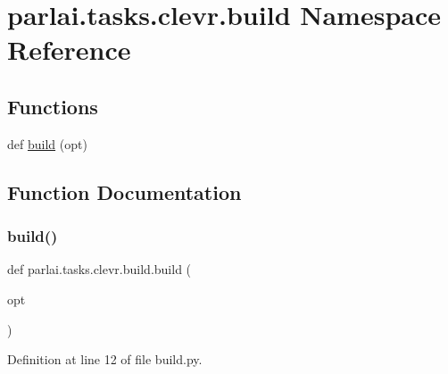 \hypertarget{namespaceparlai_1_1tasks_1_1clevr_1_1build}{}\section{parlai.\+tasks.\+clevr.\+build Namespace Reference}
\label{namespaceparlai_1_1tasks_1_1clevr_1_1build}
\subsection*{Functions}
\begin{DoxyCompactItemize}
\item 
def \hyperlink{namespaceparlai_1_1tasks_1_1clevr_1_1build_a129ccb17872c5d5b1538020e5642ab91}{build} (opt)
\end{DoxyCompactItemize}


\subsection{Function Documentation}
\mbox{\label{namespaceparlai_1_1tasks_1_1clevr_1_1build_a129ccb17872c5d5b1538020e5642ab91}} 
\subsubsection{\texorpdfstring{build()}{build()}}
{\footnotesize\ttfamily def parlai.\+tasks.\+clevr.\+build.\+build (\begin{DoxyParamCaption}\item[{}]{opt }\end{DoxyParamCaption})}



Definition at line 12 of file build.\+py.

